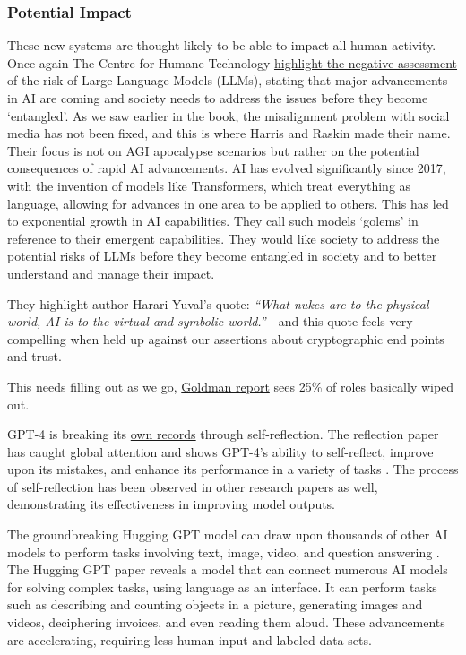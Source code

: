 \subsubsection{Potential Impact}
These new systems are thought likely to be able to impact all human activity. Once again The Centre for Humane Technology \href{https://www.humanetech.com/key-issues}{highlight the negative assessment} of the risk of Large Language Models (LLMs), stating that major advancements in AI are coming and society needs to address the issues before they become `entangled'. As we saw earlier in the book, the misalignment problem with social media has not been fixed, and this is where Harris and Raskin made their name. Their focus is not on AGI apocalypse scenarios but rather on the potential consequences of rapid AI advancements. AI has evolved significantly since 2017, with the invention of models like Transformers, which treat everything as language, allowing for advances in one area to be applied to others. This has led to exponential growth in AI capabilities. They call such models `golems' in reference to their emergent capabilities. They would like society to address the potential risks of LLMs before they become entangled in society and to better understand and manage their impact.\par
They highlight author Harari Yuval's quote: \textit{``What nukes are to the physical world, AI is to the virtual and symbolic world.''} - and this quote feels very compelling when held up against our assertions about cryptographic end points and trust.\par
This needs filling out as we go, \href{https://www.key4biz.it/wp-content/uploads/2023/03/Global-Economics-Analyst_-The-Potentially-Large-Effects-of-Artificial-Intelligence-on-Economic-Growth-Briggs_Kodnani.pdf}{Goldman report} sees 25\% of roles basically wiped out.\par 
GPT-4 is breaking its \href{https://nanothoughts.substack.com/p/reflecting-on-reflexion}{own records} through self-reflection. The reflection paper has caught global attention and shows GPT-4's ability to self-reflect, improve upon its mistakes, and enhance its performance in a variety of tasks \cite{shinn2023reflexion}. The process of self-reflection has been observed in other research papers as well, demonstrating its effectiveness in improving model outputs.\par
The groundbreaking Hugging GPT model can draw upon thousands of other AI models to perform tasks involving text, image, video, and question answering \cite{shen2023hugginggpt}. The Hugging GPT paper reveals a model that can connect numerous AI models for solving complex tasks, using language as an interface. It can perform tasks such as describing and counting objects in a picture, generating images and videos, deciphering invoices, and even reading them aloud. These advancements are accelerating, requiring less human input and labeled data sets.\par
